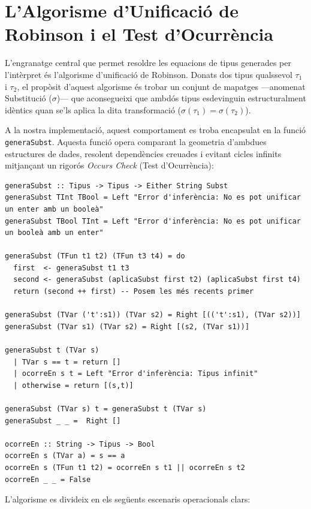 \section{L'Algorisme d'Unificació de Robinson i el Test d'Ocurrència}

L'engranatge central que permet resoldre les equacions de tipus generades per l'intèrpret és l'algorisme d'unificació de Robinson. Donats dos tipus qualssevol $\tau_1$ i $\tau_2$, el propòsit d'aquest algorisme és trobar un conjunt de mapatges —anomenat Substitució ($\sigma$)— que aconsegueixi que ambdós tipus esdevinguin estructuralment idèntics quan se'ls aplica la dita transformació ($\sigma(\tau_1) = \sigma(\tau_2)$).

A la nostra implementació, aquest comportament es troba encapsulat en la funció \texttt{generaSubst}. Aquesta funció opera comparant la geometria d'ambdues estructures de dades, resolent dependències creuades i evitant cicles infinits mitjançant un rigorós \textit{Occurs Check} (Test d'Ocurrència):

\begin{lstlisting}[style=haskellstyle, caption=Implementació del motor d'unificació de Robinson amb protecció contra tipus infinits]
generaSubst :: Tipus -> Tipus -> Either String Subst
generaSubst TInt TBool = Left "Error d'inferència: No es pot unificar un enter amb un booleà"
generaSubst TBool TInt = Left "Error d'inferència: No es pot unificar un booleà amb un enter"

generaSubst (TFun t1 t2) (TFun t3 t4) = do 
  first  <- generaSubst t1 t3
  second <- generaSubst (aplicaSubst first t2) (aplicaSubst first t4)
  return (second ++ first) -- Posem les més recents primer

generaSubst (TVar ('t':s1)) (TVar s2) = Right [(('t':s1), (TVar s2))]  
generaSubst (TVar s1) (TVar s2) = Right [(s2, (TVar s1))]  

generaSubst t (TVar s) 
  | TVar s == t = return []
  | ocorreEn s t = Left "Error d'inferència: Tipus infinit"
  | otherwise = return [(s,t)]

generaSubst (TVar s) t = generaSubst t (TVar s)
generaSubst _ _ =  Right []

ocorreEn :: String -> Tipus -> Bool
ocorreEn s (TVar a) = s == a 
ocorreEn s (TFun t1 t2) = ocorreEn s t1 || ocorreEn s t2 
ocorreEn _ _ = False
\end{lstlisting}

L'algorisme es divideix en els següents escenaris operacionals clars:

